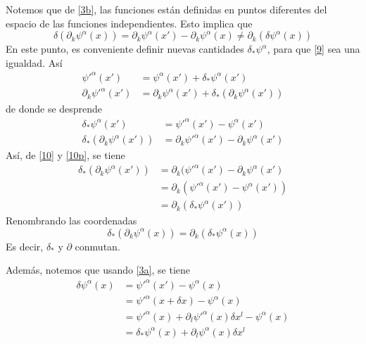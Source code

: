 Notemos que de \eqref{3b}, las funciones están definidas en puntos diferentes del espacio de las funciones independientes. Esto implica que
\begin{equation}\label{9}
  \delta (\partial_k\psi^\alpha(x))=\partial_k\psi^\alpha (x')-\partial_k\psi^\alpha (x)\neq \partial_k(\delta\psi^\alpha (x))
\end{equation}
En este punto, es conveniente definir nuevas cantidades $\delta_*\psi^\alpha$, para que \eqref{9} sea una igualdad. Así
\begin{equation}\label{10}
	\begin{split}
		\psi'^\alpha (x')&=\psi^\alpha (x')+\delta_*\psi^\alpha(x')\\
		\partial_k\psi'^\alpha (x')&=\partial_k\psi^\alpha (x')+\delta_*(\partial_k\psi^\alpha(x'))
	\end{split}
\end{equation}
de donde se desprende
\begin{equation}\label{10p}
	\begin{split}
		\delta_*\psi^\alpha(x')&=\psi'^\alpha (x')-\psi^\alpha (x')\\
		\delta_*(\partial_k\psi^\alpha(x'))&=\partial_k\psi'^\alpha (x')-\partial_k\psi^\alpha (x')
	\end{split}
\end{equation}
Así, de \eqref{10} y \eqref{10p}, se tiene
\begin{align}
  \delta_*(\partial_k\psi^\alpha(x'))&=\partial_k(\psi'^\alpha (x')-\partial_k\psi^\alpha (x')\\
  &=\partial_k(\psi'^\alpha (x')-\psi^\alpha (x'))\\
  &=\partial_k(\delta_*\psi^\alpha (x'))
\end{align}
Renombrando las coordenadas
\begin{equation}
	\delta_*(\partial_k\psi^\alpha(x))=\partial_k(\delta_*\psi^\alpha (x))
\end{equation}
Es decir, $\delta_*$ y $\partial$ conmutan.

Además, notemos que usando \eqref{3a}, se tiene
\begin{align}
  \delta \psi^\alpha (x)&=\psi'^\alpha (x')-\psi^\alpha(x)\\
  &=\psi'^\alpha (x+\delta x)-\psi^\alpha(x)\\
  &=\psi'^\alpha (x)+\partial_l\psi'^\alpha (x)\delta x^l-\psi^\alpha (x)\\
  &=\delta_*\psi^\alpha (x)+\partial_l\psi^\alpha (x)\delta x^l
\end{align}

